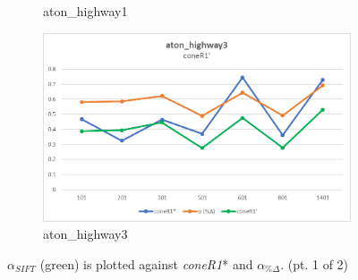 \begin{appendices}
\begin{figure}
\begin{subfigure}{.45\linewidth}
  \caption{aton\_highway1}
\end{subfigure}
\hfill
\begin{subfigure}{.45\linewidth}
  \includegraphics[width=1\linewidth]{figures/appendix/highway3_prime.jpg}
  \caption{aton\_highway3}
\end{subfigure}

\caption{$\alpha_{SIFT}$ (green) is plotted against \textit{coneR1}* and $\alpha_{\%\Delta}$. (pt. 1 of 2)}
\end{figure}


\end{appendices}
